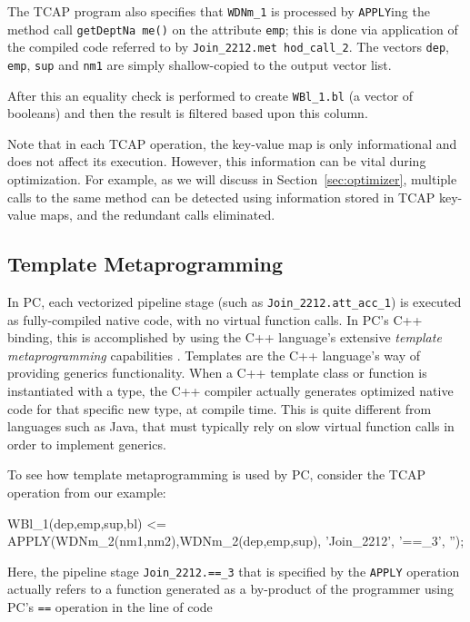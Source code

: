 The TCAP program also
specifies that \texttt{WDNm\_1} is processed by \texttt{APPLY}ing the
method call \texttt{getDeptNa me()} on the attribute \texttt{emp}; this is 
done via application of the compiled code referred to by
\texttt{Join\_2212.met hod\_call\_2}.  
The vectors \texttt{dep}, \texttt{emp}, \texttt{sup}
and \texttt{nm1} are simply shallow-copied to the output vector list.

After this an equality check is performed to create \texttt{WBl\_1.bl}
(a vector of booleans) and then the result is filtered based upon this
column.


Note that in each TCAP operation, the key-value map is only informational and does not affect its execution.  However, this
information can be vital during optimization.  For example, as we will discuss in Section~\ref{sec:optimizer}, 
multiple calls to the same method can be detected using information stored in TCAP key-value maps, and the redundant calls eliminated.

\subsection{Template Metaprogramming}
\label{sec:template}
In PC,
each vectorized pipeline stage (such as \texttt{Join\_2212.att\_acc\_1}) is executed as fully-compiled native code, with no virtual function
calls.
In PC's C++ binding, this is accomplished by using the C++ language's extensive \emph{template metaprogramming} 
capabilities \cite{josuttis2012c++}.  Templates are the C++ language's way of providing generics functionality.
When a C++ template class or
function is instantiated with a type, %
the C++ compiler actually generates optimized native code for that specific new type, at compile time.  
This is quite different from languages
such as Java, that must typically rely on slow virtual
function calls in order to implement generics.

To see how template metaprogramming is used by PC, consider
the TCAP operation from our example:

\begin{codesmall}
WBl_1(dep,emp,sup,bl) <= 
   APPLY(WDNm_2(nm1,nm2),WDNm_2(dep,emp,sup), 'Join_2212', '==_3', '');
\end{codesmall}

\noindent
Here, the pipeline stage \texttt{Join\_2212.==\_3} that is specified by the \texttt{APPLY} operation
actually refers to a function generated as a by-product of the
programmer using PC's \texttt{==} operation
in the line of code

